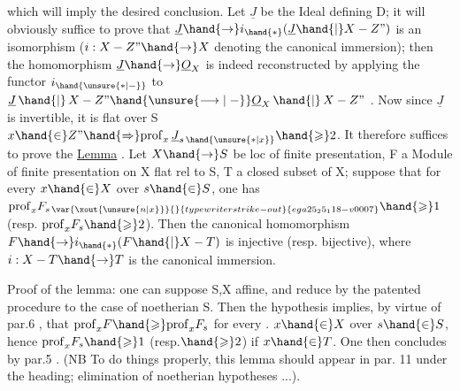 
which will imply the desired conclusion. Let $\underline{J}$ be the Ideal defining
D; it will obviously suffice to prove that $\underline{J}\hand{\to} i_{\hand{*}}(\underline{J}\hand{|}X-Z")$ is an isomorphism
($i:X-Z"\hand{\to} X$ denoting the canonical immersion); then the homomorphism
$\underline{J}\hand{\to}\underline{O}_X$ is indeed reconstructed by applying the functor $i_{\hand{\unsure{*|\relbar}}}$ to
$\underline{J}\,\hand{|}\,X-Z" \hand{\unsure{\longrightarrow|\relbar}} \underline{O}_X\,\hand{|}\,X-Z"$ . Now since $\underline{J}$ is invertible, it is flat over S 
 $x\hand{\in} Z" \hand{\Rightarrow} \mathrm{prof}_x\,\underline{J}_{s\,\hand{\unsure{*|x}}} \hand{\geqslant} 2$. It therefore suffices to prove the
\uline{Lemma} . Let $X\hand{\to} S$ be loc of finite presentation, F a Module of finite
presentation on X flat rel to S, T a closed subset of X; suppose that for
every $x\hand{\in} X$ over $s\hand{\in} S$, one has \hand{\unsure{/}} $\mathrm{prof}_x F_{s\,\var{\xout{\unsure{n|x}}}{}{typewriter strike-out}{ega25_25_118-v0007}}\hand{\geqslant} 1$ (resp. $\mathrm{prof}_x F_s \hand{\geqslant} 2$).
Then the canonical homomorphism $F\hand{\to} i_{\hand{*}}(F\hand{|}X-T)$ is injective (resp.
bijective), where $i:X-T\hand{\to} T$ is the canonical immersion.

Proof of the lemma: one can suppose S,X affine, and
reduce by the patented procedure to the case of noetherian S. Then the hypothesis
implies, by virtue of par.6 , that $\mathrm{prof}_x F \hand{\geqslant} \mathrm{prof}_x F_s$ for every .
$x\hand{\in} X$ over $s\hand{\in} S$, hence $\mathrm{prof}_x F_s \hand{\geqslant} 1$ (resp.$\hand{\geqslant} 2$) if $x\hand{\in} T$. One then concludes
by par.5 . (NB To do things properly, this lemma should appear in par.
11 under the heading; elimination of noetherian hypotheses ...).

